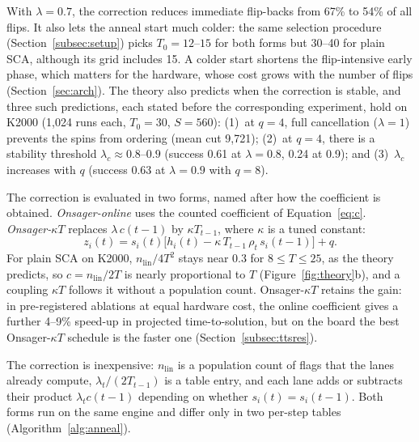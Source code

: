 With $\lambda=0.7$, the correction reduces immediate flip-backs from 67\% to 54\% of all flips. It also lets the anneal start much colder: the same selection procedure (Section~\ref{subsec:setup}) picks $T_0=12$--$15$ for both forms but 30--40 for plain SCA, although its grid includes 15. A colder start shortens the flip-intensive early phase, which matters for the hardware, whose cost grows with the number of flips (Section~\ref{sec:arch}). The theory also predicts when the correction is stable, and three such predictions, each stated before the corresponding experiment, hold on K2000 (1{,}024 runs each, $T_0=30$, $S=560$): (1)~at $q=4$, full cancellation ($\lambda=1$) prevents the spins from ordering (mean cut 9{,}721); (2)~at $q=4$, there is a stability threshold $\lambda_c\approx0.8$--$0.9$ (success 0.61 at $\lambda=0.8$, 0.24 at 0.9); and (3)~$\lambda_c$ increases with $q$ (success 0.63 at $\lambda=0.9$ with $q=8$).

The correction is evaluated in two forms, named after how the coefficient is obtained. \emph{Onsager-online} uses the counted coefficient of Equation~\eqref{eq:c}. \emph{Onsager-$\kappa T$} replaces $\lambda\,c(t{-}1)$ by $\kappa T_{t-1}$, where $\kappa$ is a tuned constant:
\begin{equation*}
  z_i(t)=s_i(t)\bigl[h_i(t)-\kappa\,T_{t-1}\,\rho_t\,s_i(t{-}1)\bigr]+q .
\end{equation*}
For plain SCA on K2000, $n_{\mathrm{lin}}/4T^2$ stays near 0.3 for $8\le T\le25$, as the theory predicts, so $c=n_{\mathrm{lin}}/2T$ is nearly proportional to $T$ (Figure~\ref{fig:theory}b), and a coupling $\kappa T$ follows it without a population count. Onsager-$\kappa T$ retains the gain: in pre-registered ablations at equal hardware cost, the online coefficient gives a further 4--9\% speed-up in projected time-to-solution, but on the board the best Onsager-$\kappa T$ schedule is the faster one (Section~\ref{subsec:ttsres}).

The correction is inexpensive: $n_{\mathrm{lin}}$ is a population count of flags that the lanes already compute, $\lambda_t/(2T_{t-1})$ is a table entry, and each lane adds or subtracts their product $\lambda_t c(t{-}1)$ depending on whether $s_i(t)=s_i(t{-}1)$. Both forms run on the same engine and differ only in two per-step tables (Algorithm~\ref{alg:anneal}).

